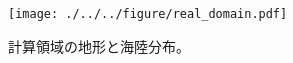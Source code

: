 \begin{figure}[tb]
\begin{center}
  \texttt{[image: ./../../figure/real\_domain.pdf]}\\
  \caption{計算領域の地形と海陸分布。}
  \label{fig:tutorial_real_domain}
\end{center}
\end{figure}
